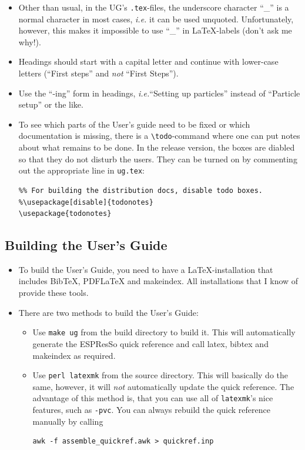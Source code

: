 \documentclass[
a4paper,                        %
11pt,                           %
twoside,                        %
footsepline,                    %
headsepline,                    %
headexclude,                    %
footexclude,                    %
pagesize,                       %
bibtotocnumbered,               %
idxtotoc                        %
]{scrreprt}
\newcommand{\es}{\mbox{\textsf{ESPResSo}}\xspace}
\newcommand{\ie}{\textit{i.e.}\xspace}
\begin{document}
\begin{itemize}
\item Other than usual, in the UG's \texttt{.tex}-files, the
  underscore character ``\_'' is a normal character in most cases, \ie
  it can be used unquoted. Unfortunately, however, this makes it
  impossible to use ``\_'' in \LaTeX-labels (don't ask me why!).
\item Headings should start with a capital letter and continue with
  lower-case letters (``First steps'' and \emph{not} ``First Steps'').
\item Use the ``-ing'' form in headings, \ie ``Setting up particles''
  instead of ``Particle setup'' or the like.
\item To see which parts of the User's guide need to be fixed or which
  documentation is missing, there is a \verb!\todo!-command where one
  can put notes about what remains to be done. In the release version,
  the boxes are diabled so that they do not disturb the users. They
  can be turned on by commenting out the appropriate line in
  \texttt{ug.tex}:
\begin{verbatim}
%% For building the distribution docs, disable todo boxes.
%\usepackage[disable]{todonotes}
\usepackage{todonotes}
\end{verbatim}

\end{itemize}

\subsection{Building the User's Guide}
\begin{itemize}
\item To build the User's Guide, you need to have a \LaTeX-installation
  that includes BibTeX, PDFLaTeX and makeindex. All installations that
  I know of provide these tools.
\item There are two methods to build the User's Guide:
  \begin{itemize}
  \item Use \texttt{make ug} from the build directory to build
    it. This will automatically generate the \es quick reference
    and call latex, bibtex and makeindex as required.
  \item Use \texttt{perl latexmk} from the source directory. This will
    basically do the same, however, it will \emph{not} automatically
    update the quick reference. The advantage of this method is, that
    you can use all of \texttt{latexmk}'s nice features, such as
    \texttt{-pvc}. You can always rebuild the quick reference manually
    by calling 
    \begin{verbatim}
awk -f assemble_quickref.awk > quickref.inp
    \end{verbatim}
  \end{itemize}
\end{itemize}
\end{document}
